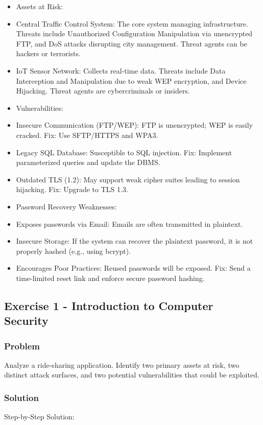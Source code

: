 \documentclass{article}
\begin{document}
\begin{itemize}
    \item[\textbf{1.}] Assets at Risk:
    \item Central Traffic Control System: The core system managing infrastructure. Threats include Unauthorized Configuration Manipulation via unencrypted FTP, and DoS attacks disrupting city management. Threat agents can be hackers or terrorists.
    \item IoT Sensor Network: Collects real-time data. Threats include Data Interception and Manipulation due to weak WEP encryption, and Device Hijacking. Threat agents are cybercriminals or insiders.

    \item[\textbf{2.}] Vulnerabilities:
    \item Insecure Communication (FTP/WEP): FTP is unencrypted; WEP is easily cracked. Fix: Use SFTP/HTTPS and WPA3.
    \item Legacy SQL Database: Susceptible to SQL injection. Fix: Implement parameterized queries and update the DBMS.
    \item Outdated TLS (1.2): May support weak cipher suites leading to session hijacking. Fix: Upgrade to TLS 1.3.

    \item[\textbf{3.}] Password Recovery Weaknesses:
    \item Exposes passwords via Email: Emails are often transmitted in plaintext.
    \item Insecure Storage: If the system can recover the plaintext password, it is not properly hashed (e.g., using bcrypt).
    \item Encourages Poor Practices: Reused passwords will be exposed. Fix: Send a time-limited reset link and enforce secure password hashing.
\end{itemize}

\subsection{Exercise 1 - Introduction to Computer Security}
\subsubsection*{Problem}
Analyze a ride-sharing application. Identify two primary assets at risk, two distinct attack surfaces, and two potential vulnerabilities that could be exploited.

\subsubsection*{Solution}
Step-by-Step Solution:
\end{document}
